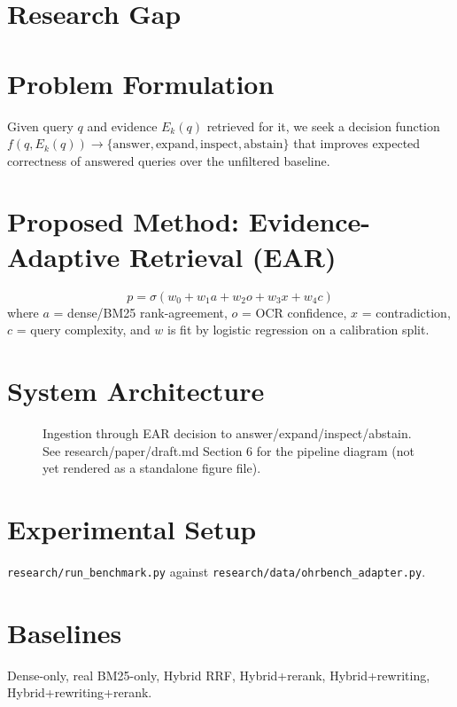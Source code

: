 \documentclass[conference]{IEEEtran}
\begin{document}
\section{Research Gap}

\section{Problem Formulation}
Given query $q$ and evidence $E_k(q)$ retrieved for it, we seek a decision function
$f(q, E_k(q)) \rightarrow \{\text{answer}, \text{expand}, \text{inspect}, \text{abstain}\}$
that improves expected correctness of answered queries over the unfiltered baseline.

\section{Proposed Method: Evidence-Adaptive Retrieval (EAR)}
\begin{equation}
p = \sigma(w_0 + w_1 a + w_2 o + w_3 x + w_4 c)
\end{equation}
where $a$ = dense/BM25 rank-agreement, $o$ = OCR confidence, $x$ = contradiction, $c$
= query complexity, and $w$ is fit by logistic regression on a calibration split.

\section{System Architecture}
\begin{figure}[h]
\centering
\caption{Ingestion through EAR decision to answer/expand/inspect/abstain. See
research/paper/draft.md Section 6 for the pipeline diagram (not yet rendered as a
standalone figure file).}
\end{figure}

\section{Experimental Setup}
\texttt{research/run\_benchmark.py} against \texttt{research/data/ohrbench\_adapter.py}.

\section{Baselines}
Dense-only, real BM25-only, Hybrid RRF, Hybrid+rerank, Hybrid+rewriting,
Hybrid+rewriting+rerank.
\end{document}
